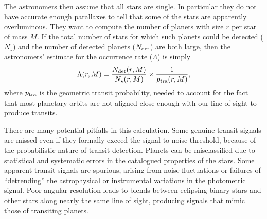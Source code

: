 \documentclass[12pt,modern]{aastex61}
\begin{document}
The astronomers then assume that all stars are single.  In particular
they do not have accurate enough parallaxes to tell that some of the
stars are apparently overluminous.  They want to compute the number of
planets with size $r$ per star of mass $M$.  If the total number of
stars for which such planets could be detected ($N_\star$) and the
number of detected planets ($N_{\rm det}$) are both large, then the
astronomers' estimate for the occurrence rate ($\Lambda$) is simply
\begin{equation}
\Lambda(r,M) = \frac{N_{\rm det}(r,M)}{N_\star(r,M)}
                    \times \frac{1}{p_{\rm tra}(r,M)},
\label{eq:occ_rate_simple}
\end{equation}
where $p_{\rm tra}$ is the geometric transit probability, needed to
account for the fact that most planetary orbits are not aligned close
enough with our line of sight to produce transits.

There are many potential pitfalls in this calculation.  Some genuine
transit signals are missed even if they formally exceed the
signal-to-noise threshold, because of the probabilistic nature of
transit detection.  Planets can be misclassified due to statistical
and systematic errors in the catalogued properties of the stars.  Some
apparent transit signals are spurious, arising from noise fluctuations
or failures of ``detrending'' the astrophysical or instrumental
variations in the photometric signal.  Poor angular resolution leads
to blends between eclipsing binary stars and other stars along nearly
the same line of sight, producing signals that mimic those of
transiting planets.
\end{document}
